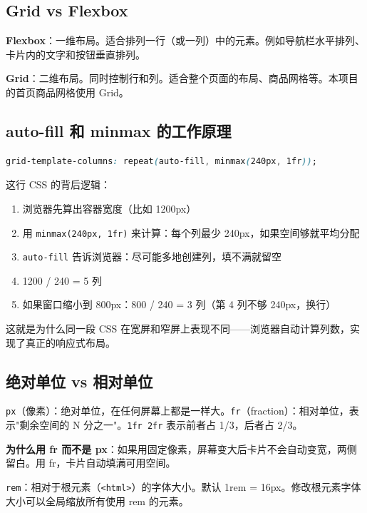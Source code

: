 \documentclass[12pt,a4paper]{ctexart}
\begin{document}
\subsection{Grid vs Flexbox}

\textbf{Flexbox}：一维布局。适合排列一行（或一列）中的元素。例如导航栏水平排列、卡片内的文字和按钮垂直排列。

\textbf{Grid}：二维布局。同时控制行和列。适合整个页面的布局、商品网格等。本项目的首页商品网格使用 Grid。

\subsection{auto-fill 和 minmax 的工作原理}

\begin{lstlisting}[language=CSS]
grid-template-columns: repeat(auto-fill, minmax(240px, 1fr));
\end{lstlisting}

这行 CSS 的背后逻辑：
\begin{enumerate}
  \item 浏览器先算出容器宽度（比如 1200px）
  \item 用 \texttt{minmax(240px, 1fr)} 来计算：每个列最少 240px，如果空间够就平均分配
  \item \texttt{auto-fill} 告诉浏览器：尽可能多地创建列，填不满就留空
  \item 1200 / 240 = 5 列
  \item 如果窗口缩小到 800px：800 / 240 = 3 列（第 4 列不够 240px，换行）
\end{enumerate}

这就是为什么同一段 CSS 在宽屏和窄屏上表现不同——浏览器自动计算列数，实现了真正的响应式布局。

\subsection{绝对单位 vs 相对单位}

\texttt{px}（像素）：绝对单位，在任何屏幕上都是一样大。\texttt{fr}（fraction）：相对单位，表示"剩余空间的 N 分之一"。\texttt{1fr 2fr} 表示前者占 1/3，后者占 2/3。

\textbf{为什么用 fr 而不是 px}：如果用固定像素，屏幕变大后卡片不会自动变宽，两侧留白。用 fr，卡片自动填满可用空间。

\texttt{rem}：相对于根元素（\texttt{<html>}）的字体大小。默认 1rem = 16px。修改根元素字体大小可以全局缩放所有使用 rem 的元素。

\end{document}
